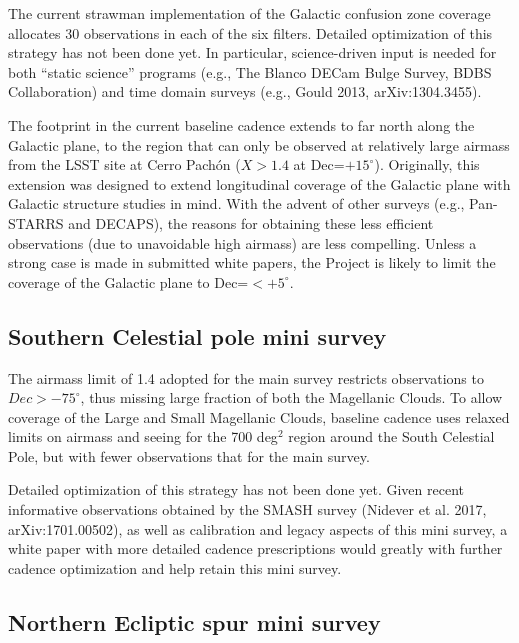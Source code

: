 \documentclass[DM,lsstdraft,toc,usenatbib]{lsstdoc}
\begin{document}
The current strawman implementation of the Galactic confusion zone coverage allocates 
30 observations in each of the six filters. Detailed optimization of this strategy has not 
been done yet. In particular, science-driven input is needed for both ``static science''
programs (e.g., The Blanco DECam Bulge Survey, BDBS Collaboration) and  time domain
surveys (e.g., Gould 2013, arXiv:1304.3455). 

The footprint in the current baseline cadence extends to far north along the Galactic
plane, to the region that can only be observed at relatively large airmass from the LSST
site at Cerro Pach\'on ($X>1.4$ at Dec=$+15^\circ$). Originally, this extension was designed 
to extend longitudinal coverage of the Galactic plane with Galactic structure studies in mind. 
With the advent of other surveys (e.g., Pan-STARRS and DECAPS), the reasons for obtaining 
these less efficient observations (due to unavoidable high airmass) are less compelling. 
Unless a strong case is made in submitted white papers, the Project is likely to limit the 
coverage of the Galactic plane to Dec=$<+5^\circ$. 


\subsection{Southern Celestial pole mini survey}

The airmass limit of 1.4 adopted for the main survey restricts observations to $Dec > -75^\circ$,
thus missing large fraction of both the Magellanic Clouds. To allow coverage of the Large and 
Small Magellanic Clouds, baseline cadence uses relaxed limits on airmass and seeing for the 
700 deg$^2$ region around the South Celestial Pole, but with fewer observations that for the
main survey. 

Detailed optimization of this strategy has not been done yet. Given recent informative observations 
obtained by the SMASH survey (Nidever et al. 2017, arXiv:1701.00502), as well as calibration 
and legacy aspects of this mini survey, a white paper with more detailed cadence prescriptions
would greatly with further cadence optimization and help retain this mini survey. 


\subsection{Northern Ecliptic spur mini survey}
\end{document}
